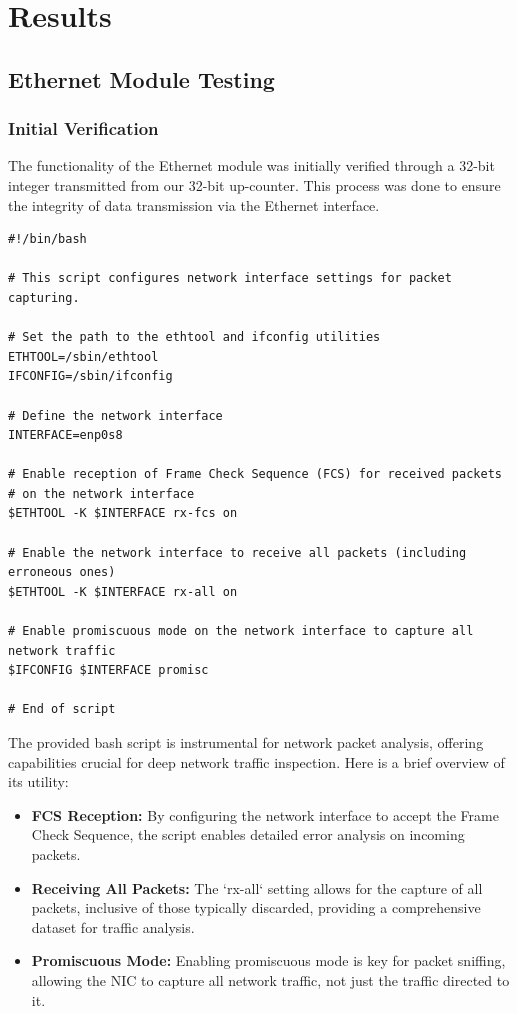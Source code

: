 \section{Results}

\subsection{Ethernet Module Testing}

\subsubsection{Initial Verification}





The functionality of the Ethernet module was initially verified through a 32-bit integer transmitted from our 32-bit up-counter. This process was done to ensure the integrity of data transmission via the Ethernet interface. 

\begin{verbatim}
#!/bin/bash

# This script configures network interface settings for packet capturing.

# Set the path to the ethtool and ifconfig utilities
ETHTOOL=/sbin/ethtool
IFCONFIG=/sbin/ifconfig

# Define the network interface
INTERFACE=enp0s8

# Enable reception of Frame Check Sequence (FCS) for received packets
# on the network interface
$ETHTOOL -K $INTERFACE rx-fcs on

# Enable the network interface to receive all packets (including erroneous ones)
$ETHTOOL -K $INTERFACE rx-all on

# Enable promiscuous mode on the network interface to capture all network traffic
$IFCONFIG $INTERFACE promisc

# End of script
\end{verbatim}


The provided bash script is instrumental for network packet analysis, offering capabilities crucial for deep network traffic inspection. Here is a brief overview of its utility:

\begin{itemize}
  \item \textbf{FCS Reception:} By configuring the network interface to accept the Frame Check Sequence, the script enables detailed error analysis on incoming packets.
  \item \textbf{Receiving All Packets:} The `rx-all` setting allows for the capture of all packets, inclusive of those typically discarded, providing a comprehensive dataset for traffic analysis.
  \item \textbf{Promiscuous Mode:} Enabling promiscuous mode is key for packet sniffing, allowing the NIC to capture all network traffic, not just the traffic directed to it.
\end{itemize}





